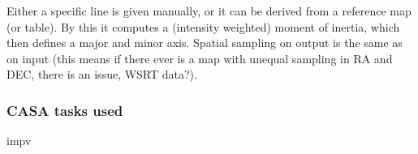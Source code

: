 Either a specific line is given manually, or it can be derived from a reference map (or table).
By this it computes a (intensity weighted) moment of inertia, which then defines a major and minor
axis. Spatial sampling on output is the same as on input (this means if there ever
is a map with unequal sampling in RA and DEC, there is an issue, WSRT data?).


\subsubsection{CASA tasks used}

\begin{description}

\item[impv]

\end{description}


\clearpage
